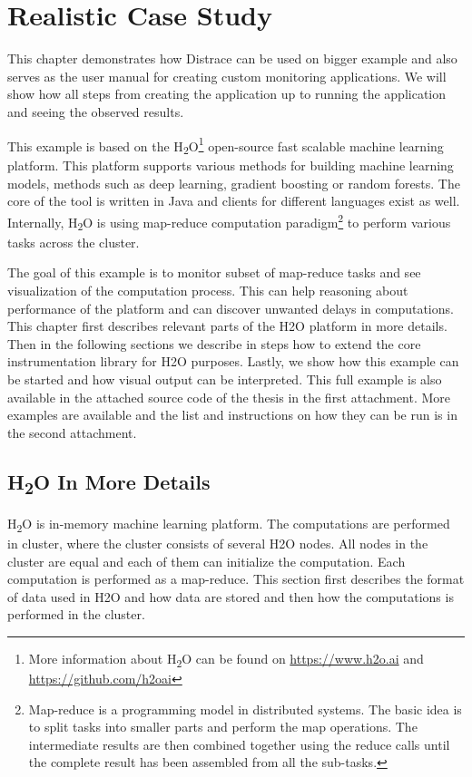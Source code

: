 \chapter{Realistic Case Study}
\label{chap:big_example}
This chapter demonstrates how Distrace can be used on bigger example and also serves as the user manual for creating custom monitoring applications. We will show how all steps from creating the application up to running the application and seeing the observed results.

This example is based on the H\textsubscript{2}O\footnote{More information about H\textsubscript{2}O can be found on \url{https://www.h2o.ai} and \url{https://github.com/h2oai}} open-source fast scalable machine learning platform. This platform supports various methods for building machine learning models, methods such as deep learning, gradient boosting or random forests. The core of the tool is written in Java and clients for different languages exist as well. Internally, H\textsubscript{2}O is using map-reduce computation paradigm\footnote{Map-reduce is a programming model in distributed systems. The basic idea is to split tasks into smaller parts and perform the map operations. The intermediate results are then combined together using the reduce calls until the complete result has been assembled from all the sub-tasks.} to perform various tasks across the cluster.

The goal of this example is to monitor subset of map-reduce tasks and see visualization of the computation process. This can help reasoning about performance of the platform and can discover unwanted delays in computations. This chapter first describes relevant parts of the H2O platform in more details. Then in the following sections we describe in steps how to extend the core instrumentation library for H2O purposes. Lastly, we show how this example can be started and how visual output can be interpreted. 
This full example is also available in the attached source code of the thesis in the first attachment. More examples are available and the list and instructions on how they can be run is in the second attachment.

\section{H\textsubscript{2}O In More Details}
H\textsubscript{2}O is in-memory machine learning platform. The computations are performed in cluster, where the cluster consists of several H2O nodes. All nodes in the cluster are equal and each of them can initialize the computation. Each computation is performed as a map-reduce. This section first describes the format of data used in H2O and how data are stored and then how the computations is performed in the cluster. 

